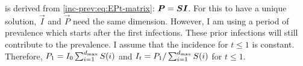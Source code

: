 \documentclass[thesis.tex]{subfiles}
\begin{document}
\begin{algorithm}
    \caption{%
      Algorithm to transform 500 posterior samples posterior samples of $\vec{P}$ to posterior samples of $\vec{Z}$.
      Assumes constant incidence for $t \leq 1$ where $t = 1$ is the first day of prevalence data.
      Calculation of $Z^{(j)}_{i,t}$ is from \cref{transmission:eq:forward-substitute}.
    }
    \label{transmission:alg:calculate-Z}
\end{algorithm}

 is derived from \cref{inc-prev:eq:EPt-matrix}: $\bm{P} = \bm{S} \bm{I}$.
For this to have a unique solution, $\vec{I}$ and $\vec{P}$ need the same dimension.
However, I am using a period of prevalence which starts after the first infections.
These prior infections will still contribute to the prevalence.
I assume that the incidence for $t \leq 1$ is constant.
Therefore, $P_1 = I_0 \sum_{i=1}^{d_\text{max}} S(i)$ and $I_t = P_1 / \sum_{i=1}^{d_\text{max}} S(i)$ for $t \leq 1$.

\end{document}

